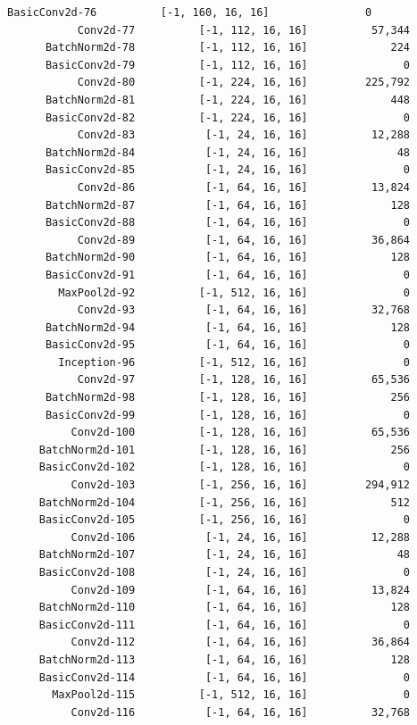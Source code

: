 \documentclass[a4paper, 12pt]{article}
\begin{document}
\begin{lstlisting}[language=sh]
      BasicConv2d-76          [-1, 160, 16, 16]               0
           Conv2d-77          [-1, 112, 16, 16]          57,344
      BatchNorm2d-78          [-1, 112, 16, 16]             224
      BasicConv2d-79          [-1, 112, 16, 16]               0
           Conv2d-80          [-1, 224, 16, 16]         225,792
      BatchNorm2d-81          [-1, 224, 16, 16]             448
      BasicConv2d-82          [-1, 224, 16, 16]               0
           Conv2d-83           [-1, 24, 16, 16]          12,288
      BatchNorm2d-84           [-1, 24, 16, 16]              48
      BasicConv2d-85           [-1, 24, 16, 16]               0
           Conv2d-86           [-1, 64, 16, 16]          13,824
      BatchNorm2d-87           [-1, 64, 16, 16]             128
      BasicConv2d-88           [-1, 64, 16, 16]               0
           Conv2d-89           [-1, 64, 16, 16]          36,864
      BatchNorm2d-90           [-1, 64, 16, 16]             128
      BasicConv2d-91           [-1, 64, 16, 16]               0
        MaxPool2d-92          [-1, 512, 16, 16]               0
           Conv2d-93           [-1, 64, 16, 16]          32,768
      BatchNorm2d-94           [-1, 64, 16, 16]             128
      BasicConv2d-95           [-1, 64, 16, 16]               0
        Inception-96          [-1, 512, 16, 16]               0
           Conv2d-97          [-1, 128, 16, 16]          65,536
      BatchNorm2d-98          [-1, 128, 16, 16]             256
      BasicConv2d-99          [-1, 128, 16, 16]               0
          Conv2d-100          [-1, 128, 16, 16]          65,536
     BatchNorm2d-101          [-1, 128, 16, 16]             256
     BasicConv2d-102          [-1, 128, 16, 16]               0
          Conv2d-103          [-1, 256, 16, 16]         294,912
     BatchNorm2d-104          [-1, 256, 16, 16]             512
     BasicConv2d-105          [-1, 256, 16, 16]               0
          Conv2d-106           [-1, 24, 16, 16]          12,288
     BatchNorm2d-107           [-1, 24, 16, 16]              48
     BasicConv2d-108           [-1, 24, 16, 16]               0
          Conv2d-109           [-1, 64, 16, 16]          13,824
     BatchNorm2d-110           [-1, 64, 16, 16]             128
     BasicConv2d-111           [-1, 64, 16, 16]               0
          Conv2d-112           [-1, 64, 16, 16]          36,864
     BatchNorm2d-113           [-1, 64, 16, 16]             128
     BasicConv2d-114           [-1, 64, 16, 16]               0
       MaxPool2d-115          [-1, 512, 16, 16]               0
          Conv2d-116           [-1, 64, 16, 16]          32,768

\end{lstlisting}
\end{document}
